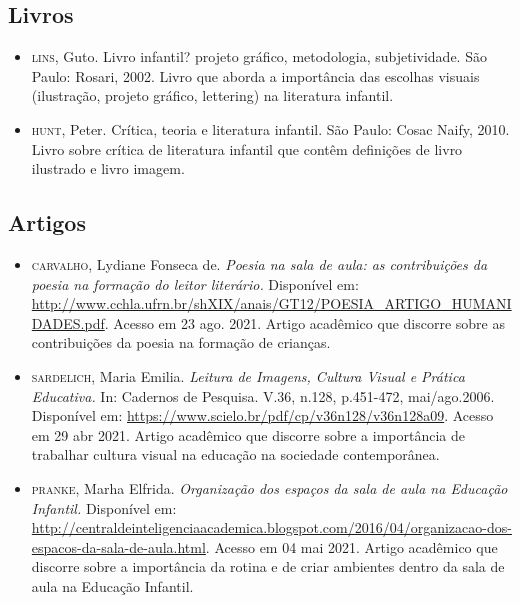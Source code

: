 \documentclass[11pt]{extarticle}
\begin{document}
\subsection{Livros} 

\begin{itemize}
\item \textsc{lins}, Guto. Livro infantil? projeto gráfico, metodologia, subjetividade. São Paulo: Rosari, 2002.
Livro que aborda a importância das escolhas visuais (ilustração, projeto gráfico, lettering) na literatura infantil.  

\item \textsc{hunt}, Peter. Crítica, teoria e literatura infantil. São Paulo: Cosac Naify, 2010.
Livro sobre crítica de literatura infantil que contêm definições de livro ilustrado e livro imagem. 
\end{itemize}

\subsection{Artigos}

\begin{itemize}

	\item \textsc{carvalho}, Lydiane Fonseca de. \emph{Poesia na sala de aula: as contribuições da poesia na formação
	do leitor literário.} Disponível em: \url{http://www.cchla.ufrn.br/shXIX/anais/GT12/POESIA_ARTIGO_HUMANIDADES.pdf}. Acesso em 23 ago. 2021.
	Artigo acadêmico que discorre sobre as contribuições da poesia na formação de crianças.
	\item \textsc{sardelich}, Maria Emilia. \emph{Leitura de Imagens, Cultura Visual e Prática Educativa.} 
In: Cadernos de Pesquisa. V.36, n.128, p.451-472, mai/ago.2006. Disponível em: \url{https://www.scielo.br/pdf/cp/v36n128/v36n128a09}. 
Acesso em 29 abr 2021. 
Artigo acadêmico que discorre sobre a importância de trabalhar cultura 
visual na educação na sociedade contemporânea. 

\item \textsc{pranke}, Marha Elfrida. \emph{Organização dos espaços da sala de aula na Educação Infantil.} Disponível em: 
\url{http://centraldeinteligenciaacademica.blogspot.com/2016/04/organizacao-dos-espacos-da-sala-de-aula.html}. Acesso em 04 mai 2021. 
Artigo acadêmico que discorre sobre a importância da rotina e de criar ambientes dentro da sala de aula na Educação Infantil.  
\end{itemize}
\end{document}
